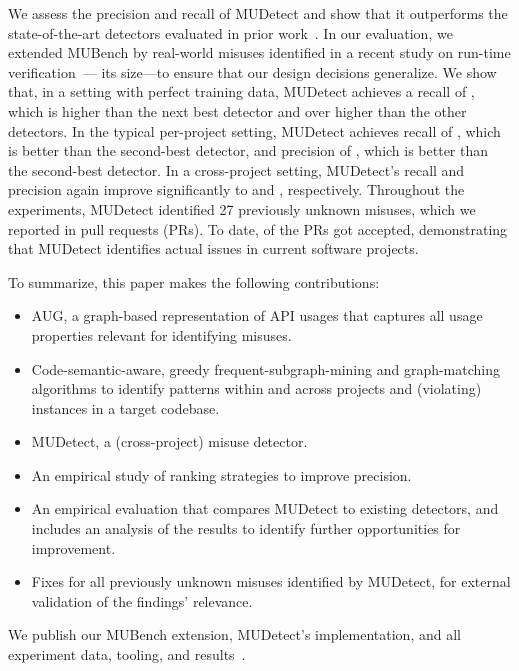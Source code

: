 We assess the precision and recall of MUDetect and show that it outperforms the  state-of-the-art detectors evaluated in prior work~\cite{ANNN+17}.
In our evaluation, we extended MUBench by  real-world misuses identified in a recent study on run-time verification~\cite{LHXRM16}--- its size---to ensure that our design decisions generalize.
%
We show that, in a setting with perfect training data, MUDetect achieves a recall of , which is  higher than the next best detector and over  higher than the other detectors.
In the typical per-project setting, MUDetect achieves recall of , which is  better than the second-best detector, and precision of , which is  better than the second-best detector.
In a cross-project setting, MUDetect's recall and precision again improve significantly to  and , respectively.
%
Throughout the experiments, MUDetect identified 27 previously unknown misuses, which we reported in  pull requests (PRs).
To date,  of the PRs got accepted, demonstrating that MUDetect identifies actual issues in current software projects.



To summarize, this paper makes the following contributions:
%
\begin{itemize}[leftmargin=*]
  \item AUG, a graph-based representation of API usages that captures all usage properties relevant for identifying misuses. 
  \item Code-semantic-aware, greedy frequent-subgraph-mining and graph-matching algorithms to identify patterns within and across projects and (violating) instances in a target codebase.
  \item MUDetect, a (cross-project) misuse detector.
  \item An empirical study of ranking strategies to improve precision.
  \item An empirical evaluation that compares MUDetect to existing detectors, and includes an analysis of the results to identify further opportunities for improvement.
  \item Fixes for all previously unknown misuses identified by MUDetect, for external validation of the findings' relevance.
\end{itemize}

We publish our MUBench extension, MUDetect's implementation, and all experiment data, tooling, and results~\cite{artifact-page}.

